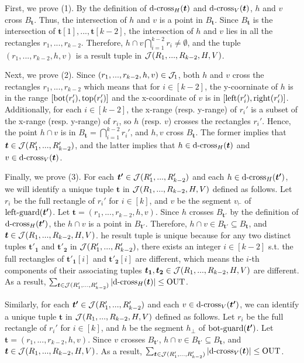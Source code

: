 First, we prove (1). By the definition of $\mathrm{d\text{-}cross}_H(\textrm{\boldmath${t}$})$ and $\mathrm{d\text{-}cross}_V(\textrm{\boldmath${t}$})$, $h$ and $v$ cross $B_\bm{t}$. Thus, the intersection of $h$ and $v$ is a point in $B_\bm{t}$. Since $B_\bm{t}$ is the intersection of $\bm{t}[1],...,\bm{t}[k-2]$, the intersection of $h$ and $v$ lies in all the rectangles $r_1,...,r_{k-2}$. Therefore, $h\cap v\bigcap_{i = 1}^{k-2}r_i \neq \emptyset$, and  the tuple $(r_1,...,r_{k-2},h,v)$ is a result tuple in $\mathcal{J}(R_1,...,R_{k-2},H,V)$. 

Next, we prove (2). Since $(r_1,...,r_{k-2},h,v)\in \mathcal{J}_1$, both $h$
 and $v$ cross the rectangles $r_1,...,r_{k-2}$ which means that for $i\in[k-2]$, the y-coorninate of $h$ is in the range $[\mathrm{bot}(r_i'), \mathrm{top}(r_i')]$ and the x-coordinate of $v$ is in $[\mathrm{left}(r_i'), \mathrm{right}(r_i')]$. Additionally, for each $i\in[k-2]$, the x-range (resp. y-range) of $r_i'$ is a subset of the x-range (resp. y-range) of $r_i$, so $h$ (resp. $v$) crosses the rectangles $r_i'$. Hence, the point $h \cap v$ is in $B_\bm{t} = \bigcap_{i = 1}^{k-2}r_i'$, and $h, v$ cross $B_{\bm{t}}$. The former implies that $\textrm{\boldmath${t}$} \in \mathcal{J}(R_1',...,R_{k-2}')$, and the latter implies that $h \in \mathrm{d\text{-}cross}_H(\textrm{\boldmath${t}$})$ and $v \in \mathrm{d\text{-}cross}_V(\textrm{\boldmath${t}$})$.

Finally, we prove (3). 
For each $\textrm{\boldmath${t'}$}\in  \mathcal{J}(R_1',...,R_{k-2}')$ and each $h \in \mathrm{d\text{-}cross}_H(\textrm{\boldmath${t'}$})$, we will identify a unique tuple $\bm{t}$ in $\mathcal{J}(R_1,...,R_{k-2},H,V)$ defined as follows. Let $r_i$ be the full rectangle of $r_i'$ for $i \in [k]$, and $v$ be the segment $v_\vdash$ of $\mathrm{left\text{-}guard}(\textrm{\boldmath${t'}$})$. Let $\bm{t} = (r_1,...,r_{k-2},h,v)$. Since $h$ crosses $B_{\bm{t'}}$ by the definition of $\mathrm{d\text{-}cross}_H(\textrm{\boldmath${t'}$})$, the $h\cap v$ is a point in $B_{\bm{t'}}$. 
Therefore, $h\cap v \in B_{\bm{t'}} \subseteq B_{\bm{t}}$, and $\textrm{\boldmath${t}$}\in \mathcal{J}(R_1,...,R_{k-2},H,V)$. he result tuple is unique because for any two distinct tuples $\bm{t'_1}$ and $\bm{t'_2}$ in $\mathcal{J}(R_1',...,R_{k-2}')$, there exists an integer $i \in [k-2]$ s.t. the full rectangles of $\bm{t'_1}[i]$ and $\bm{t'_2}[i]$ are different, which means the $i$-th components of their associating tuples $\textrm{\boldmath${t_1}$}, \textrm{\boldmath${t_2}$} \in \mathcal{J}(R_1,...,R_{k-2},H,V)$ are different. As a result, $\sum_{\textrm{\boldmath${t}$}\in \mathcal{J}(R_1',...,R_{k-2}')}  |\mathrm{d\text{-}cross}_H(\textrm{\boldmath${t}$})| \leq \mathrm{OUT}$. 

Similarly, for each $\textrm{\boldmath${t'}$}\in  \mathcal{J}(R_1',...,R_{k-2}')$ and each $v \in \mathrm{d\text{-}cross}_V(\textrm{\boldmath${t'}$})$, we can identify a unique tuple $\bm{t}$ in $\mathcal{J}(R_1,...,R_{k-2},H,V)$ defined as follows. Let $r_i$ be the full rectangle of $r_i'$ for $i \in [k]$, and $h$ be the segment $h_\bot$ of $\mathrm{bot\text{-}guard}(\textrm{\boldmath${t'}$})$. Let $\bm{t} = (r_1,...,r_{k-2},h,v)$. Since $v$ crosses $B_{\bm{t'}}$, $h\cap v \in B_{\bm{t'}} \subseteq B_{\bm{t}}$, and $\textrm{\boldmath${t}$}\in \mathcal{J}(R_1,...,R_{k-2},H,V)$. As a result, $\sum_{\textrm{\boldmath${t}$}\in \mathcal{J}(R_1',...,R_{k-2}')}  |\mathrm{d\text{-}cross}_V(\textrm{\boldmath${t}$})| \leq \mathrm{OUT}$. 